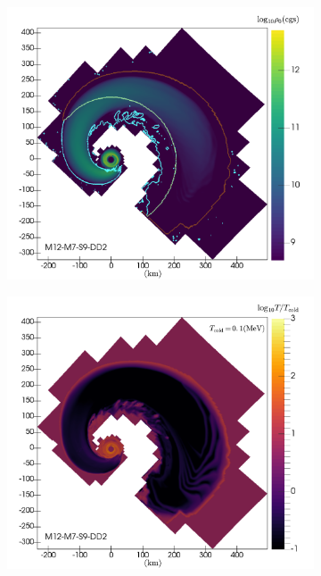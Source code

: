 \begin{figure}
	\centering
	\begin{subfigure}[b]{0.475\textwidth}
		\centering
		\includegraphics[width=1.0\linewidth]{images/rho_DD2_M12-5ms-inertial-flagged}
		\label{fig:rho_M12_DD2_5ms}
	\end{subfigure}
	\begin{subfigure}[b]{0.475\textwidth}
		\centering
		\includegraphics[width=\linewidth]{images/temp_DD2_M12-5ms-inertial}

\end{subfigure}
\end{figure}
